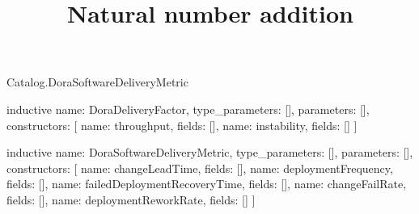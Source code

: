 \begin{lexlean}{Catalog.DoraSoftwareDeliveryMetric}
\title{Natural number addition}
\begin{semanticmodule}
inductive{
  name: DoraDeliveryFactor,
  type_parameters: [],
  parameters: [],
  constructors: [
    {name: throughput, fields: []},
    {name: instability, fields: []}
  ]
}

inductive{
  name: DoraSoftwareDeliveryMetric,
  type_parameters: [],
  parameters: [],
  constructors: [
    {name: changeLeadTime, fields: []},
    {name: deploymentFrequency, fields: []},
    {name: failedDeploymentRecoveryTime, fields: []},
    {name: changeFailRate, fields: []},
    {name: deploymentReworkRate, fields: []}
  ]
}
\end{semanticmodule}
\end{lexlean}
